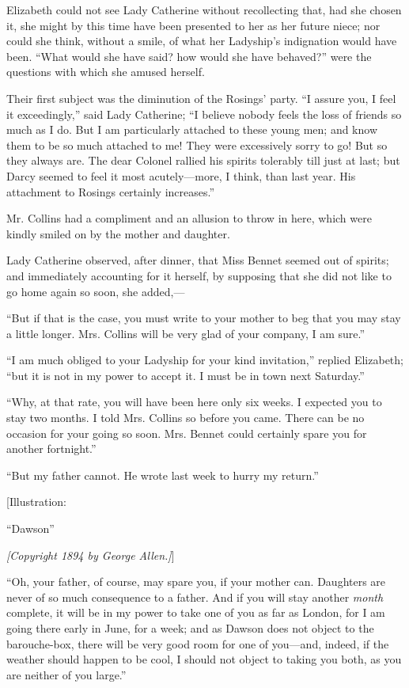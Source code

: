 \documentclass[12pt]{book}
\begin{document}
Elizabeth could not see Lady Catherine without recollecting that, had she chosen it, she might by this time have been presented to her as her future niece; nor could she think, without a smile, of what her Ladyship's indignation would have been. ``What would she have said? how would she have behaved?'' were the questions with which she amused herself.

Their first subject was the diminution of the Rosings' party. ``I assure you, I feel it exceedingly,'' said Lady Catherine; ``I believe nobody feels the loss of friends so much as I do. But I am particularly attached to these young men; and know them to be so much attached to me! They were excessively sorry to go! But so they always are. The dear Colonel rallied his spirits tolerably till just at last; but Darcy seemed to feel it most acutely---more, I think, than last year. His attachment to Rosings certainly increases.''

Mr. Collins had a compliment and an allusion to throw in here, which were kindly smiled on by the mother and daughter.

Lady Catherine observed, after dinner, that Miss Bennet seemed out of spirits; and immediately accounting for it herself, by supposing that she did not like to go home again so soon, she added,---

``But if that is the case, you must write to your mother to beg that you may stay a little longer. Mrs. Collins will be very glad of your company, I am sure.''

``I am much obliged to your Ladyship for your kind invitation,'' replied Elizabeth; ``but it is not in my power to accept it. I must be in town next Saturday.''

``Why, at that rate, you will have been here only six weeks. I expected you to stay two months. I told Mrs. Collins so before you came. There can be no occasion for your going so soon. Mrs. Bennet could certainly spare you for another fortnight.''

``But my father cannot. He wrote last week to hurry my return.''

[Illustration:

``Dawson''

\emph{[\textit{Copyright 1894 by George Allen.}]}]

``Oh, your father, of course, may spare you, if your mother can. Daughters are never of so much consequence to a father. And if you will stay another \textit{month} complete, it will be in my power to take one of you as far as London, for I am going there early in June, for a week; and as Dawson does not object to the barouche-box, there will be very good room for one of you---and, indeed, if the weather should happen to be cool, I should not object to taking you both, as you are neither of you large.''
\end{document}
